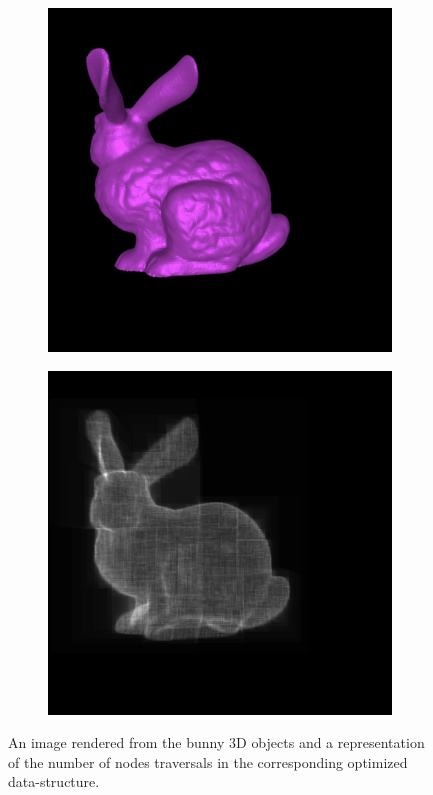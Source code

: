 \documentclass[a4paper,11pt]{article}%
\begin{document}
\begin{figure}[h]
    \centering
    
\begin{subfigure}{.5\textwidth}
  \centering
  \includegraphics[width=.9\linewidth]{img/bunny.png}
\end{subfigure}%
\begin{subfigure}{.5\textwidth}
  \centering
  \includegraphics[width=.9\linewidth]{img/tbbunny.png}
\end{subfigure}    
    
    \caption{An image rendered from the bunny 3D objects and a representation of the number of nodes traversals in the corresponding optimized data-structure.}
    \label{fig:dsbunny}
\end{figure}
\end{document}
